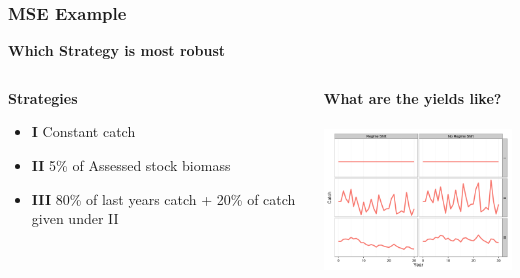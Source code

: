 \begin{frame}\frametitle{MSE Example}
\smallskip\textbf{Which Strategy is most robust}\smallskip\\
\begin{columns}[t] 
\begin{column}[T]{4cm} %
     \smallskip\textbf{Strategies}\smallskip\\
       \Fontviii
       \begin{itemize}
          \item \textbf{I} Constant catch
          \item \textbf{II} 5\% of Assessed stock biomass
          \item \textbf{III} 80\% of last years catch + 20\% of catch given under II
        \end{itemize}
     \end{column}
\begin{column}[T]{6cm}
 \smallskip\textbf{What are the yields like?}\smallskip\\ 
  \includegraphics[height=48mm,width=64mm]{mp2.png}
\end{column}
     \end{columns}    
\end{frame}

